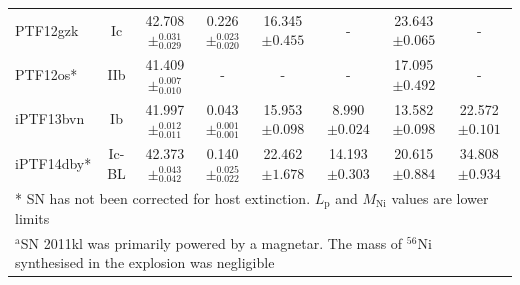 \documentclass[a4paper,fleqn,usenatbib]{mnras}
\begin{document}
\begin{table}
\renewcommand{\arraystretch}{1.5}
 \centering
 \begin{minipage}{160mm}
 \begin{tabular}{lccccccc}
  \hline

PTF12gzk & Ic & 42.708$\pm^{0.031}_{0.029}$ & 0.226$\pm^{0.023}_{0.020}$ & 16.345$\pm{0.455}$ & - & 23.643$\pm 0.065$ & -\\
PTF12os* & IIb & 41.409$\pm^{0.007}_{0.010}$ & - & - & - & 17.095$\pm 0.492$ & -\\
iPTF13bvn & Ib & 41.997$\pm^{0.012}_{0.011}$ & 0.043$\pm^{0.001}_{0.001}$ & 15.953$\pm{0.098}$ & 8.990$\pm 0.024$ & 13.582$\pm 0.098$ & 22.572$\pm 0.101$\\
iPTF14dby* & Ic-BL & 42.373$\pm^{0.043}_{0.042}$ & 0.140$\pm^{0.025}_{0.022}$ & 22.462$\pm{1.678}$ & 14.193$\pm 0.303$ & 20.615$\pm 0.884$ & 34.808$\pm 0.934$\\
 \hline
 \multicolumn{8}{p{\textwidth}}{* SN has not been corrected for host extinction. $L_{\mathrm{p}}$ and $M_{\mathrm{Ni}}$ values are lower limits}\\
  \multicolumn{8}{p{\textwidth}}{$^{\mathrm{a}}$SN 2011kl was primarily powered by a magnetar. The mass of $^{56}$Ni synthesised in the explosion was negligible \citep{Greiner2015}}
\end{tabular}
\end{minipage}
\end{table}
\end{document}
